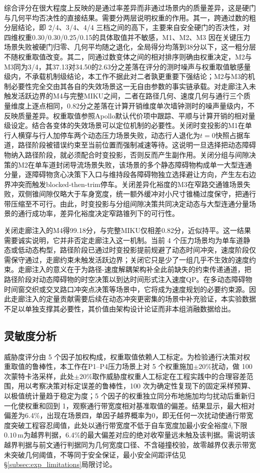 \documentclass[a4paper,11pt]{ctexart}
\theoremstyle{definition}
\begin{document}
综合评分在很大程度上反映的是通过率差异而非通过场景内的质量差异，这是硬门与几何平均否决性的直接结果。需要分两层说明权重的作用。其一，跨通过数的粗分层结论，即 2/4、3/4、4/4 三档之间的高下，主要来自安全硬门的否决性，对四维权重0.30/0.30/0.25/0.15的具体取值并不敏感，M1、M2、M3 因在关键压力场景失败被硬门归零、几何平均随之退化，全局得分均落到38分以下，这一粗分层不随权重取值改变。其二，同通过数变体之间的相对排序则确由权重决定，M2与M3同为3/4，其37.13对34.50的2.63分之差落在评分的测时噪声与权重取值敏感量级内，不承载机制级结论，本工作不据此对二者孰更重要下强结论；M2与M3的机制必要性完全交由其各自的失效场景这一无自由参数的事实链承载。对走廊注入未触发活跃边界的M4与完整MIKU之间，二者在路径几何、速度几何与通行三个质量维度上逐点相同，0.82分之差落在计算开销维度单次墙钟测时的噪声量级内，不反映质量差异。权重取值参照Apollo默认代价项中跟踪、平顺与计算开销的相对量级设定。结合各变体的失效场景可以定位机制的必要性。关闭时变投影的M1在单行人横穿与行人加停车两个动态压力场景失败，动态行人退化为$t=0$快照占据车道，路径阶段被错误约束至当前位置而强制减速等待。这说明一旦选择把动态障碍物纳入路径阶段，就必须配合时变投影，否则反而产生副作用。关闭分组与间隙决策的M2在单车道封闭导流场景失败，该场景的多个静态障碍物构成单一大型连通分量，逐障碍物贪心决策下入口与维持段各障碍物独立选择避让方向，产生左右边界冲突而触发blocked-then-trim停车。关闭差异化裕度的M3在窄路交通锥场景失败，双侧锥间隙仅略大于车身宽度，统一额外缓冲对小尺寸锥桶过度保守，把通行带压缩至不可行。由此，时变投影与分组间隙决策共同决定动态与大型连通分量场景的通行成功率，差异化裕度决定窄路锥列下的可行性。

关闭走廊注入的M4得99.18分，与完整MIKU仅相差0.82分，近似持平。这一结果需要诚实说明，它并非否定走廊注入这一机制。当前 4 个压力场景均为单车道静态或低动态构型，路径阶段已通过时变投影提前规避了动态时间冲突，速度阶段仅需保守通过，走廊约束未触发活跃边界；关闭它只是少了一组几乎不生效的速度约束。走廊注入的意义在于为路径-速度解耦架构补全此前缺失的约束传递通道，把路径阶段对动态障碍物的时空决策以到达时间形式注入速度QP。在多动态障碍物时间窗交织或交叉路口冲突点决策等场景中，它将成为速度规划的必要约束源。因此走廊注入的定量贡献需要后续在动态冲突更密集的场景中补充验证，本实验数据不足以单独支撑其必要性，其价值由架构设计论证而非本组消融数据给出。

\subsection{灵敏度分析}
\label{subsec:exp_sensitivity}

威胁度评分由 5 个因子加权构成，权重取值依赖人工标定。为检验通行决策对权重取值的鲁棒性，本工作在P1--P4压力场景上对 5 个权重施加$\pm 20\%$扰动，做 100 次蒙特卡洛采样，此处$\pm 20\%$取作威胁度权重人工标定在工程实践中的合理容差范围，用以考察决策对标定误差的鲁棒性，100 次为确定性复现下的固定采样预算、以极值统计量趋于稳定为度；5 个因子的权重独立同分布地施加均匀扰动后重新归一化使权重和回到 1，观察通行带宽度相对基准取值的偏差。结果显示，最大相对偏差为6.4\%，出现在场景四，单因子越界概率为0，即无任何一次扰动使通行带宽度突破工程容忍阈值，此处以通行带宽度不低于自车宽度加最小安全裕度$\delta_i$下限$0.10$\,m为越界判据，6.4\%的最大偏差对应的绝对收窄量远未触及该判据。需说明该越界判据与前文通行判据同为几何宽度口径、不含碰撞校验，故零越界仅表示带宽未突破几何阈值，不等同于安全保证，最小安全间距评估见§\ref{subsec:exp_limitations}局限讨论。
\end{document}
